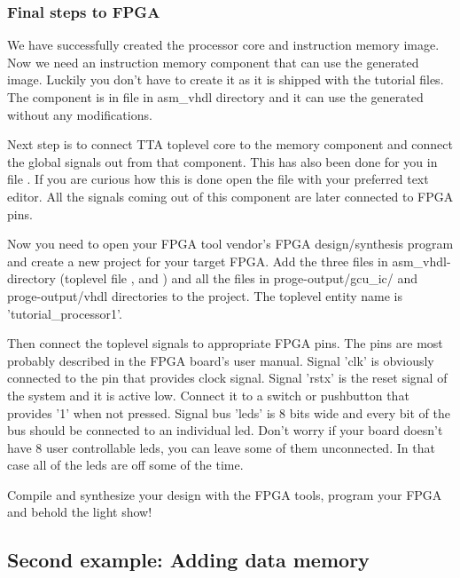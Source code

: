\documentclass[twoside]{tceusermanual}
\begin{document}


\subsubsection{Final steps to FPGA}
We have successfully created the processor core and instruction memory image.
Now we need an instruction memory component that can use the generated image.
Luckily you don't have to create it as it is shipped with the tutorial files.
The component is in file  in asm\_vhdl directory
and it can use the generated  without any
modifications.

Next step is to connect TTA toplevel core to the memory component and connect
the global signals out from that component. This has also been done for you in
file . If you are curious how this is done
open the file with your preferred text editor. All the signals coming out of
this component are later connected to FPGA pins.

Now you need to open your FPGA tool vendor's FPGA design/synthesis program and
create a new project for your target FPGA. Add the three files in 
asm\_vhdl-directory (toplevel file , 
 and ) and all the
files in proge-output/gcu\_ic/ and proge-output/vhdl directories to the
project. The toplevel entity name is 'tutorial\_processor1'.

Then connect the toplevel signals to appropriate FPGA pins. The pins are most
probably described in the FPGA board's user manual. Signal 'clk' is obviously
connected to the pin that provides clock signal. Signal 'rstx' is the reset
signal of the system and it is active low. Connect it to a switch or
pushbutton that provides '1' when not pressed. Signal bus 'leds' is 8 bits
wide and every bit of the bus should be connected to an individual led. Don't
worry if your board doesn't have 8 user controllable leds, you can leave some
of them unconnected. In that case all of the leds are off some of the time.

Compile and synthesize your design with the FPGA tools, program your FPGA and
behold the light show!

\subsection{Second example: Adding data memory}
\end{document}
